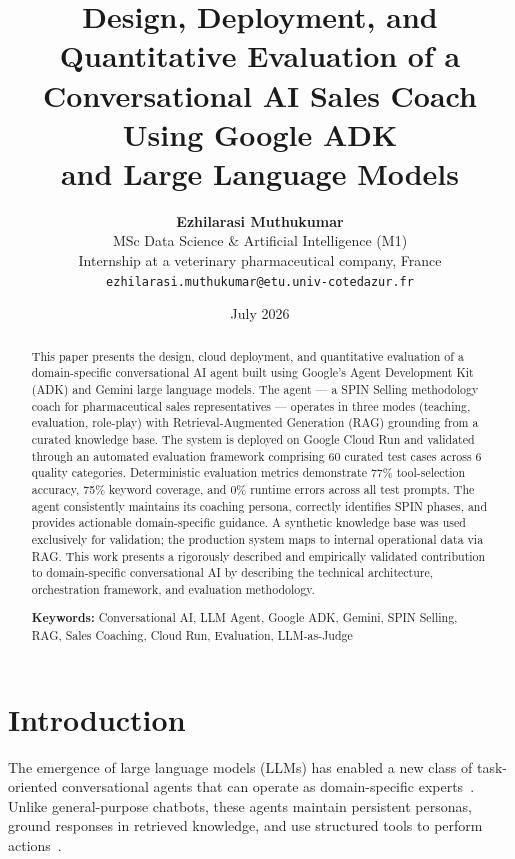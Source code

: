 \documentclass[10pt,twocolumn,a4paper]{article}
\title{\vspace{-1.5cm}\textbf{Design, Deployment, and Quantitative Evaluation of a\\Conversational AI Sales Coach Using Google ADK\\and Large Language Models}\vspace{-0.3cm}}
\author{
    \textbf{Ezhilarasi Muthukumar}\\
    \small MSc Data Science \& Artificial Intelligence (M1)\\
    \small Internship at a veterinary pharmaceutical company, France\\
    \small \texttt{ezhilarasi.muthukumar@etu.univ-cotedazur.fr}
}
\date{\small July 2026}
\begin{document}
\maketitle
\thispagestyle{fancy}

\begin{abstract}
\noindent This paper presents the design, cloud deployment, and quantitative evaluation of a domain-specific conversational AI agent built using Google's Agent Development Kit (ADK) and Gemini large language models. The agent --- a SPIN Selling methodology coach for pharmaceutical sales representatives --- operates in three modes (teaching, evaluation, role-play) with Retrieval-Augmented Generation (RAG) grounding from a curated knowledge base. The system is deployed on Google Cloud Run and validated through an automated evaluation framework comprising 60 curated test cases across 6 quality categories. Deterministic evaluation metrics demonstrate 77\% tool-selection accuracy, 75\% keyword coverage, and 0\% runtime errors across all test prompts. The agent consistently maintains its coaching persona, correctly identifies SPIN phases, and provides actionable domain-specific guidance. A synthetic knowledge base was used exclusively for validation; the production system maps to internal operational data via RAG. This work presents a rigorously described and empirically validated contribution to domain-specific conversational AI by describing the technical architecture, orchestration framework, and evaluation methodology.

\medskip
\noindent\textbf{Keywords:} Conversational AI, LLM Agent, Google ADK, Gemini, SPIN Selling, RAG, Sales Coaching, Cloud Run, Evaluation, LLM-as-Judge
\end{abstract}

\section{Introduction}
\label{sec:intro}

The emergence of large language models (LLMs) has enabled a new class of task-oriented conversational agents that can operate as domain-specific experts~\cite{wei2022emergent}. Unlike general-purpose chatbots, these agents maintain persistent personas, ground responses in retrieved knowledge, and use structured tools to perform actions~\cite{schick2023toolformer}.
\end{document}
